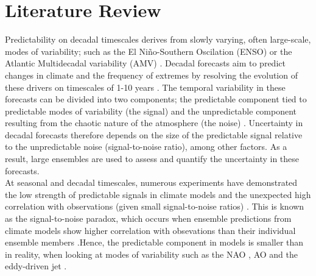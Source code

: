 \documentclass{article}
\begin{document}
\section*{Literature Review}

Predictability on decadal timescales derives from slowly varying, often large-scale, modes of variability; such as the El Niño-Southern Oscilation (ENSO) or the Atlantic Multidecadal variability (AMV) \parencite{smith2012current}. Decadal forecasts aim to predict changes in climate and the frequency of extremes by resolving the evolution of these drivers on timescales of 1-10 years \parencite{eade2012forecasting}. The temporal variability in these forecasts can be divided into two components; the predictable component tied to predictable modes of variability (the signal) and the unpredictable component resulting from the chaotic nature of the atmosphere (the noise) \parencite{eade2014seasonal}. Uncertainty in decadal forecasts therefore depends on the size of the predictable signal relative to the unpredictable noise (signal-to-noise ratio), among other factors. As a result, large ensembles are used to assess and quantify the uncertainty in these forecasts. \\

At seasonal and decadal timescales, numerous experiments have demonstrated the low strength of predictable signals in climate models and the unexpected high correlation with observations (given small signal-to-noise ratios) \parencite{eade2014seasonal,riddle2013cfsv2,scaife2014skillful,kang2014prediction,dunstone2016skilful,smith2020north,marcheggiani2023decadal}. This is known as the signal-to-noise paradox, which occurs when ensemble predictions from climate models show higher correlation with obsevations than their individual ensemble members \parencite{scaife2018signal}.Hence, the predictable component in models is smaller than in reality, when looking at modes of variability such as the NAO \parencite{smith2020north,dunstone2016skilful}, AO \parencite{riddle2013cfsv2,kang2014prediction} and the eddy-driven jet \parencite{marcheggiani2023decadal}.\\
\end{document}

